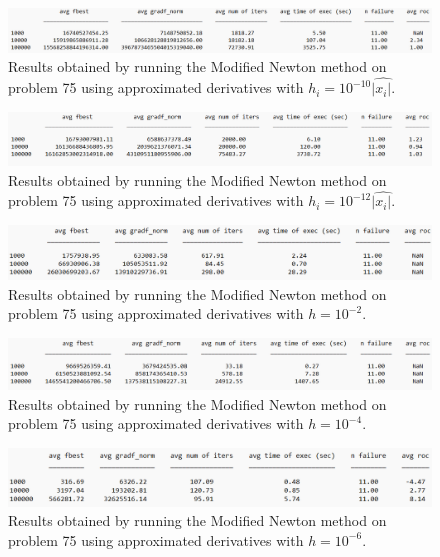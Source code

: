 \begin{figure}[H]
    \centering
    \includegraphics[width=1\textwidth]{img/pb75_table_MN_REL_10.png}
    \caption{Results obtained by running the Modified Newton method on problem 75 using approximated derivatives with $h_i=10^{-10}|\hat{x_i|}$.} 
\end{figure}

\begin{figure}[H]
    \centering
    \includegraphics[width=1\textwidth]{img/pb75_table_MN_REL_12.png}
    \caption{Results obtained by running the Modified Newton method on problem 75 using approximated derivatives with $h_i=10^{-12}|\hat{x_i|}$.} 
\end{figure}

\begin{figure}[H]
    \centering
    \includegraphics[width=1\textwidth]{img/pb75_table_MN_COST_2.png}
    \caption{Results obtained by running the Modified Newton method on problem 75 using approximated derivatives with $h=10^{-2}$.} 
\end{figure}

\begin{figure}[H]
    \centering
    \includegraphics[width=1\textwidth]{img/pb75_table_MN_COST_4.png}
    \caption{Results obtained by running the Modified Newton method on problem 75 using approximated derivatives with $h=10^{-4}$.} 
\end{figure}

\begin{figure}[H]
    \centering
    \includegraphics[width=1\textwidth]{img/pb75_table_MN_COST_6.png}
    \caption{Results obtained by running the Modified Newton method on problem 75 using approximated derivatives with $h=10^{-6}$.} 
\end{figure}

